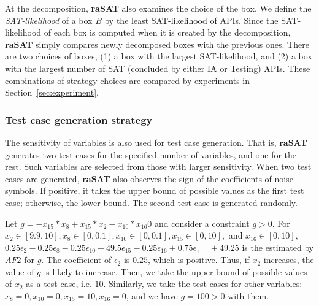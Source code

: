 \documentclass[runningheads,a4paper,oribibl]{llncs}
\newcommand{\suppress}[1]{} %
\begin{document}
At the decomposition, {\bf raSAT} also examines the choice of the box.
We define the {\em SAT-likelihood} of a box $B$ by 
the least SAT-likelihood of APIs. 
Since the SAT-likelihood of each box is computed when it is created by the decomposition,
{\bf raSAT} simply compares newly decomposed boxes with the previous ones. 
There are two choices of boxes, 
(1) a box with the largest SAT-likelihood, and 
(2) a box with the largest number of SAT (concluded by either IA or Testing) APIs. 
These combinations of strategy choices are compared by experiments in Section~\ref{sec:experiment}. 


\subsubsection*{Test case generation strategy}
\sloppy
The sensitivity of variables is also used for test case generation.
That is, {\bf raSAT} generates two test cases for the specified number of variables,
and one for the rest. 
Such variables are selected from those with larger sensitivity.
When two test cases are generated, {\bf raSAT} also observes
the sign of the coefficients of noise symbols.
If positive, it takes the upper bound of possible values as the first test case; 
otherwise, the lower bound. The second test case is generated randomly. 

\begin{example}
  Let $g = -x_{15}*x_8+x_{15}*x_2-x_{10}*x_{16}0$ and consider a constraint $g > 0$. 
  For ${x_2 \in [9.9, 10]}, {x_8 \in [0, 0.1]}, {x_{10} \in [0, 0.1]}, {x_{15} \in [0, 10]},$ and
  $ x_{16} \in [0, 10]$, 
  ${0.25 \epsilon_2 - 0.25 \epsilon_8 - 0.25 \epsilon_{10} + 49.5\epsilon_{15} - 0.25\epsilon_{16}
    + 0.75\epsilon_{+-} + 49.25}$ is the estimated by $AF2$ for $g$.
  The coefficient of $\epsilon_2$ is $0.25$, which is positive. 
  Thus, if $x_2$ increases, the value of $g$ is likely to increase.
  Then, we take the upper bound of possible values of $x_2$ as a test case, i.e. $10$. 
  Similarly, we take the test cases for other variables: $x_8=0, x_{10}=0, x_{15}=10, x_{16}=0$, and 
  we have $g=100 > 0$ with them. 
\end{example}
\suppress{
I. Selecting API for Testing:
  (1) Difficulty first by SAT-likelihood.   
  (2) Easy first by SAT-likelihood
  (10) Random.,
II. Selecting Variable:
  (8) With sensitivity
  (9) Without sensitivity - Random: 
III. Selecting box:
  (3) SAT-directed using IA-Testing.
  (4) UNSAT-directed using IA-Testing.
  (5) SAT-directed using SAT-likelihood
  (6) UNSAT-directed using SAT-likelihood
  (7) Random
}
\end{document}
